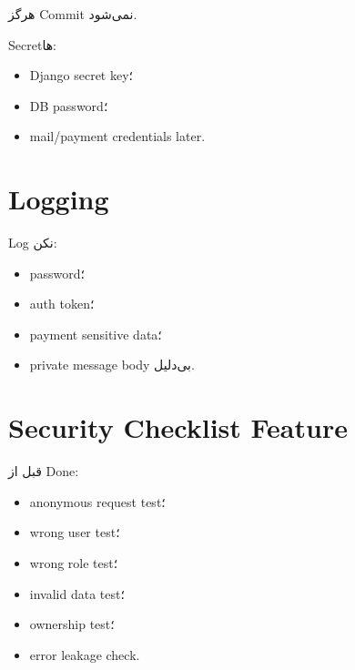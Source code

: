  هرگز Commit نمی‌شود.

Secretها:
\begin{itemize}
  \item Django secret key؛
  \item DB password؛
  \item mail/payment credentials later.
\end{itemize}

\section{Logging}

Log نکن:
\begin{itemize}
  \item password؛
  \item auth token؛
  \item payment sensitive data؛
  \item private message body بی‌دلیل.
\end{itemize}

\section{Security Checklist Feature}

قبل از Done:
\begin{itemize}
  \item anonymous request test؛
  \item wrong user test؛
  \item wrong role test؛
  \item invalid data test؛
  \item ownership test؛
  \item error leakage check.
\end{itemize}
